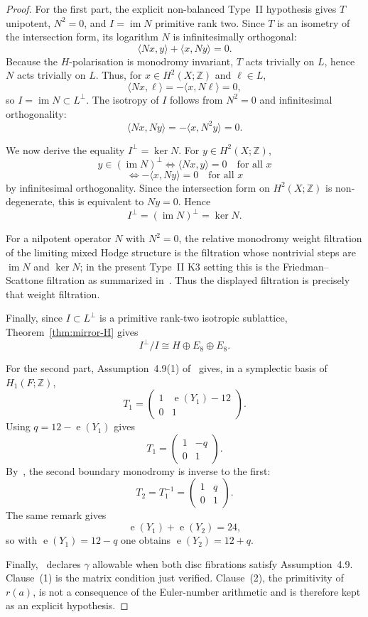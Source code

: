 \documentclass[12pt]{article}
\theoremstyle{plain}
\theoremstyle{definition}
\DeclareMathOperator{\im}{im}
\DeclareMathOperator{\eul}{e}
\newcommand{\bZ}{\mathbb{Z}}
\begin{document}
\begin{proof}
For the first part, the explicit non-balanced Type~II hypothesis gives $T$ unipotent, $N^2=0$, and $I=\im N$ primitive rank two.  Since $T$ is an isometry of the intersection form, its logarithm $N$ is infinitesimally orthogonal:
\[
\langle Nx,y\rangle + \langle x,Ny\rangle=0.
\]
Because the $H$-polarisation is monodromy invariant, $T$ acts trivially on $L$, hence $N$ acts trivially on $L$.  Thus, for $x\in H^2(X;\bZ)$ and $\ell\in L$,
\[
\langle Nx,\ell\rangle = -\langle x,N\ell\rangle=0,
\]
so $I=\im N\subset L^\perp$.  The isotropy of $I$ follows from $N^2=0$ and infinitesimal orthogonality:
\[
\langle Nx,Ny\rangle=-\langle x,N^2y\rangle=0.
\]

We now derive the equality $I^\perp=\ker N$.  For $y\in H^2(X;\bZ)$,
\[
y\in (\im N)^\perp
\iff
\langle Nx,y\rangle=0\quad\text{for all }x
\]
\[
\iff
-\langle x,Ny\rangle=0\quad\text{for all }x
\]
by infinitesimal orthogonality.  Since the intersection form on $H^2(X;\bZ)$ is non-degenerate, this is equivalent to $Ny=0$.  Hence
\[
I^\perp=(\im N)^\perp=\ker N.
\]

For a nilpotent operator $N$ with $N^2=0$, the relative monodromy weight filtration of the limiting mixed Hodge structure is the filtration whose nontrivial steps are $\im N$ and $\ker N$; in the present Type~II K3 setting this is the Friedman--Scattone filtration as summarized in~\cite[\S3.1]{GT24}.  Thus the displayed filtration is precisely that weight filtration.

Finally, since $I\subset L^\perp$ is a primitive rank-two isotropic sublattice, Theorem~\ref{thm:mirror-H} gives
\[
I^\perp/I\cong H\oplus E_8\oplus E_8.
\]

For the second part, Assumption~4.9(1) of~\cite{GT24} gives, in a symplectic basis of $H_1(F;\bZ)$,
\[
T_1=
\begin{pmatrix}
1 & \eul(Y_1)-12\\
0 & 1
\end{pmatrix}.
\]
Using $q=12-\eul(Y_1)$ gives
\[
T_1=
\begin{pmatrix}
1 & -q\\
0 & 1
\end{pmatrix}.
\]
By~\cite[Remark~4.12]{GT24}, the second boundary monodromy is inverse to the first:
\[
T_2=T_1^{-1}=
\begin{pmatrix}
1 & q\\
0 & 1
\end{pmatrix}.
\]
The same remark gives
\[
\eul(Y_1)+\eul(Y_2)=24,
\]
so with $\eul(Y_1)=12-q$ one obtains $\eul(Y_2)=12+q$.

Finally,~\cite[Definition~4.11]{GT24} declares $\gamma$ allowable when both disc fibrations satisfy Assumption~4.9.  Clause~(1) is the matrix condition just verified.  Clause~(2), the primitivity of $r(a)$, is not a consequence of the Euler-number arithmetic and is therefore kept as an explicit hypothesis.
\end{proof}
\end{document}
